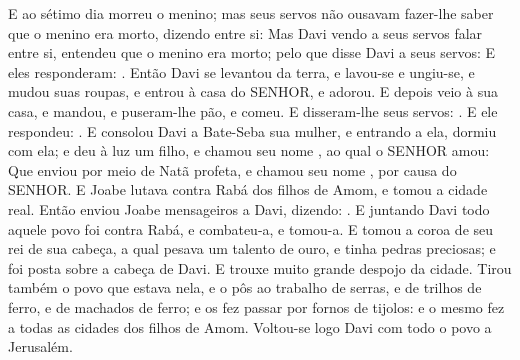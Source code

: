 {  E ao sétimo dia morreu o menino; mas seus servos não ousavam fazer-lhe saber que o menino era morto, dizendo entre si: 
  Mas Davi vendo a seus servos falar entre si, entendeu que o menino era morto; pelo que disse Davi a seus servos:  E eles responderam: .
  Então Davi se levantou da terra, e lavou-se e ungiu-se, e mudou suas roupas, e entrou à casa do SENHOR, e adorou. E depois veio à sua casa, e mandou, e puseram-lhe pão, e comeu.
  E disseram-lhe seus servos: .
  E ele respondeu: .
  E consolou Davi a Bate-Seba sua mulher, e entrando a ela, dormiu com ela; e deu à luz um filho, e chamou seu nome , ao qual o SENHOR amou:
  Que enviou por meio de Natã profeta, e chamou seu nome , por causa do SENHOR.
  E Joabe lutava contra Rabá dos filhos de Amom, e tomou a cidade real.
  Então enviou Joabe mensageiros a Davi, dizendo: .
  E juntando Davi todo aquele povo foi contra Rabá, e combateu-a, e tomou-a.
  E tomou a coroa de seu rei de sua cabeça, a qual pesava um talento de ouro, e tinha pedras preciosas; e foi posta sobre a cabeça de Davi. E trouxe muito grande despojo da cidade.
  Tirou também o povo que estava nela, e o pôs ao trabalho de serras, e de trilhos de ferro, e de machados de ferro; e os fez passar por fornos de tijolos: e o mesmo fez a todas as cidades dos filhos de Amom. Voltou-se logo Davi com todo o povo a Jerusalém.
\par }

